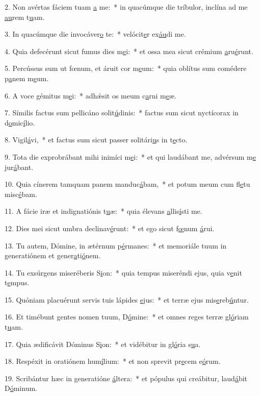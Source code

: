 2. Non avértas fáciem tuam \uline{a} me:~* in quacúmque die tríbulor, inclína ad me \uline{au}rem t\uline{u}am.\par 
3. In quacúmque die invocáver\uline{o} te:~* velócit\uline{e}r ex\uline{áu}di me.\par 
4. Quia defecérunt sicut fumus dies m\uline{e}i:~* et ossa mea sicut crémium \uline{a}ru\uline{é}runt.\par 
5. Percússus sum ut fœnum, et áruit cor m\uline{e}um:~* quia oblítus sum comédere p\uline{a}nem m\uline{e}um.\par 
6. A voce gémitus m\uline{e}i:~* adhǽsit os meum c\uline{a}rni m\uline{e}æ.\par 
7. Símilis factus sum pellicáno solit\uline{ú}dinis:~* factus sum sicut nyctícorax in d\uline{o}mic\uline{í}lio.\par 
8. Vigil\uline{á}vi,~* et factus sum sicut passer solitári\uline{u}s in t\uline{e}cto.\par 
9. Tota die exprobrábant mihi inimíci m\uline{e}i:~* et qui laudábant me, advérsum m\uline{e} jur\uline{á}bant.\par 
10. Quia cínerem tamquam panem manduc\uline{á}bam,~* et potum meum cum fl\uline{e}tu misc\uline{é}bam.\par 
11. A fácie iræ et indignatiónis t\uline{u}æ:~* quia élevans \uline{a}llis\uline{í}sti me.\par 
12. Dies mei sicut umbra declinav\uline{é}runt:~* et ego sicut f\uline{œ}num \uline{á}rui.\par 
13. Tu autem, Dómine, in ætérnum p\uline{é}rmanes:~* et memoriále tuum in generatiónem et gener\uline{a}ti\uline{ó}nem.\par 
14. Tu exsúrgens miseréberis S\uline{i}on:~* quia tempus miseréndi ejus, quia v\uline{e}nit t\uline{e}mpus.\par 
15. Quóniam placuérunt servis tuis lápides \uline{e}jus:~* et terræ ejus mis\uline{e}reb\uline{ú}ntur.\par 
16. Et timébunt gentes nomen tuum, D\uline{ó}mine:~* et omnes reges terræ gl\uline{ó}riam t\uline{u}am.\par 
17. Quia ædificávit Dóminus S\uline{i}on:~* et vidébitur in gl\uline{ó}ria s\uline{u}a.\par 
18. Respéxit in oratiónem hum\uline{í}lium:~* et non sprevit pr\uline{e}cem e\uline{ó}rum.\par 
19. Scribántur hæc in generatióne \uline{á}ltera:~* et pópulus qui creábitur, laud\uline{á}bit D\uline{ó}minum.\par 
